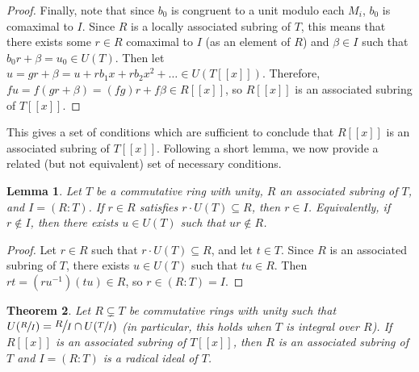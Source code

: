 \documentclass[12pt]{amsart}
\newtheorem{theorem}{Theorem}[section]
\newtheorem{lemma}[theorem]{Lemma}
\theoremstyle{definition}
\newcommand{\quot}[2]{\large\sfrac{#1}{#2}\normalsize}
\begin{document}
\begin{proof}
    Finally, note that since $b_0$ is congruent to a unit modulo each $M_i$, $b_0$ is comaximal to $I$. Since $R$ is a locally associated subring of $T$, this means that there exists some $r\in R$ comaximal to $I$ (as an element of $R$) and $\beta\in I$ such that $b_0r+\beta=u_0\in U(T)$. Then let $u=gr+\beta=u+rb_1x+rb_2x^2+\dots\in U(T[[x]])$. Therefore, $fu=f(gr+\beta)=(fg)r+f\beta\in R[[x]]$, so $R[[x]]$ is an associated subring of $T[[x]]$.
\end{proof}

This gives a set of conditions which are sufficient to conclude that $R[[x]]$ is an associated subring of $T[[x]]$. Following a short lemma, we now provide a related (but not equivalent) set of necessary conditions.

\begin{lemma}
    \label{associate not in R}
    Let $T$ be a commutative ring with unity, $R$ an associated subring of $T$, and $I=(R:T)$. If $r\in R$ satisfies $r\cdot U(T)\subseteq R$, then $r\in I$. Equivalently, if $r\notin I$, then there exists $u\in U(T)$ such that $ur\notin R$.
\end{lemma}

\begin{proof}
    Let $r\in R$ such that $r\cdot U(T)\subseteq R$, and let $t\in T$. Since $R$ is an associated subring of $T$, there exists $u\in U(T)$ such that $tu\in R$. Then $rt=(ru^{-1})(tu)\in R$, so $r\in (R:T)=I$.
\end{proof}

\begin{theorem}
    \label{associated ps necessary}
    Let $R\subsetneq T$ be commutative rings with unity such that $U(\sfrac{R}{I})= \quot{R}{I}\cap U(\sfrac{T}{I})$ (in particular, this holds when $T$ is integral over $R$). If $R[[x]]$ is an associated subring of $T[[x]]$, then $R$ is an associated subring of $T$ and $I=(R:T)$ is a radical ideal of $T$.
\end{theorem}
\end{document}
